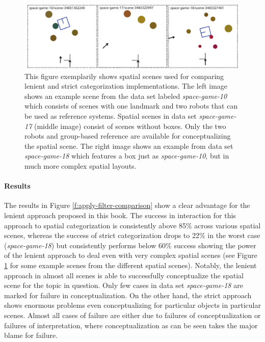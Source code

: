 \begin{figure}
\begin{center}
\includegraphics[width=1.0\columnwidth]{figs/apply-filter-comparison-scenes}
\end{center}
\caption[Spatial scenes used to compare lenient vs. strict categorization]
{
This figure exemplarily shows spatial scenes used for comparing lenient and strict
categorization implementations. The left image shows an example scene from the data 
set labeled \emph{space-game-10} which consists of scenes with one landmark and two robots 
that can be used as reference systems. Spatial scenes in data set \emph{space-game-17} (middle image) consist of scenes without boxes.
Only the two robots and group-based reference are available for conceptualizing the spatial
scene. The right image shows an example from data set \emph{space-game-18} which features a box 
just as \emph{space-game-10}, but in much more complex spatial layouts.}
\label{f:lenient-vs-strict-scenes}
\end{figure}

\paragraph*{Results}
The results in Figure \ref{f:apply-filter-comparison} show
a clear advantage for the lenient approach proposed in this 
book. The success in interaction for this approach to 
spatial categorization is consistently above 85\% across various 
spatial scenes, whereas the success of strict categorization drops to 22\%
in the worst case ({\it space-game-18}) but consistently performs below 60\%
success showing the power of the lenient approach to deal even with 
very complex spatial scenes (see Figure \ref{f:lenient-vs-strict-scenes} for
some example scenes from the different spatial scenes). Notably,
the lenient approach in almost all scenes is able to successfully conceptualize
the spatial scene for the topic in question. Only few cases in data set \emph{space-game-18}
are marked for failure in conceptualization. On the other hand, the strict
approach shows enormous problems even conceptualizing for particular
objects in particular scenes. Almost all cases of failure are either due to 
failures of conceptualization or failures of interpretation, where conceptualization
as can be seen takes the major blame for failure.

